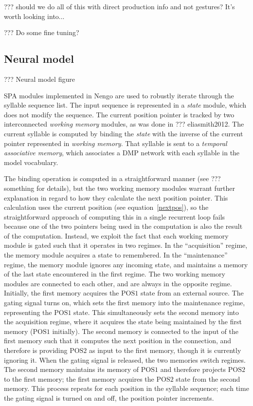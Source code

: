 ??? should we do all of this with direct production info
and not gestures? It's worth looking into...

??? Do some fine tuning?

\subsection{Neural model}

??? Neural model figure

SPA modules implemented in Nengo are used
to robustly iterate through
the syllable sequence list.
The input sequence is represented
in a \textit{state} module,
which does not modify the sequence.
The current position pointer
is tracked by two interconnected
\textit{working memory} modules,
as was done in ??? eliasmith2012.
The current syllable is computed
by binding the \textit{state}
with the inverse of the
current pointer represented
in \textit{working memory}.
That syllable is sent to
a \textit{temporal associative memory},
which associates a DMP network
with each syllable in the model vocabulary.

The binding operation is computed
in a straightforward manner
(see ??? something for details),
but the two working memory modules
warrant further explanation
in regard to how they
calculate the next position pointer.
This calculation
uses the current position
(see equation~\eqref{nextpos}),
so the straightforward approach
of computing this in a single recurrent loop
fails because one of the two pointers
being used in the computation
is also the result of the computation.
Instead, we exploit the fact that
each working memory module is gated
such that it operates in two regimes.
In the ``acquisition'' regime,
the memory module acquires a state to remembered.
In the ``maintenance'' regime,
the memory module ignores any incoming state,
and maintains a memory of the last state
encountered in the first regime.
The two working memory modules
are connected to each other,
and are always in the opposite regime.
Initially, the first memory
acquires the $\text{POS1}$ state
from an external source.
The gating signal turns on,
which sets the first memory
into the maintenance regime,
representing the $\text{POS1}$ state.
This simultaneously sets the second memory
into the acquisition regime,
where it acquires the state
being maintained by the first memory
($\text{POS1}$ initially).
The second memory is connected
to the input of the first memory
such that it computes the
next position in the connection,
and therefore is providing
$\text{POS2}$ as input to the first memory,
though it is currently ignoring it.
When the gating signal is released,
the two memories switch regimes.
The second memory maintains
its memory of $\text{POS1}$
and therefore projects $\text{POS2}$
to the first memory;
the first memory acquires
the $\text{POS2}$ state from the second memory.
This process repeats for each position
in the syllable sequence;
each time the gating signal
is turned on and off,
the position pointer increments.

